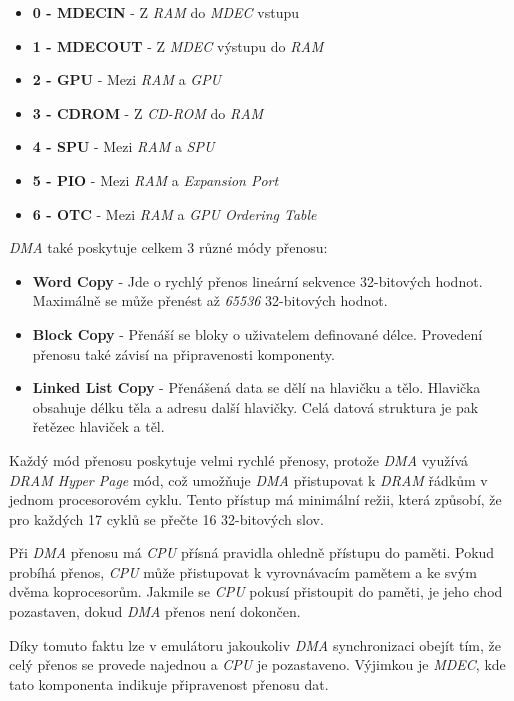 \begin{itemize}
    \item{\textbf{0 - MDECIN} - Z \textit{RAM} do \textit{MDEC} vstupu}
    \item{\textbf{1 - MDECOUT} - Z \textit{MDEC} výstupu do \textit{RAM}}
    \item{\textbf{2 - GPU} - Mezi \textit{RAM} a \textit{GPU}}
    \item{\textbf{3 - CDROM} - Z \textit{CD-ROM} do \textit{RAM}}
    \item{\textbf{4 - SPU} - Mezi \textit{RAM} a \textit{SPU}}
    \item{\textbf{5 - PIO} - Mezi \textit{RAM} a \textit{Expansion Port}}
    \item{\textbf{6 - OTC} - Mezi \textit{RAM} a \textit{GPU Ordering Table}}
\end{itemize}

\textit{DMA} také poskytuje celkem 3 různé módy přenosu:

\begin{itemize}
    \item{\textbf{Word Copy} - Jde o rychlý přenos lineární sekvence 32-bitových hodnot. Maximálně se může přenést až \textit{65536} 32-bitových hodnot.}
    \item{\textbf{Block Copy} - Přenáší se bloky o uživatelem definované délce. Provedení přenosu také závisí na připravenosti komponenty.}
    \item{\textbf{Linked List Copy} - Přenášená data se dělí na hlavičku a tělo. Hlavička obsahuje délku těla a adresu další hlavičky. Celá datová struktura je pak řetězec hlaviček a těl.}
\end{itemize}

Každý mód přenosu poskytuje velmi rychlé přenosy, protože \textit{DMA} využívá \textit{DRAM Hyper Page} mód, 
což umožňuje \textit{DMA} přistupovat k \textit{DRAM} řádkům v jednom procesorovém cyklu. 
Tento přístup má minimální režii, která způsobí, že pro každých 17 cyklů se přečte 16 32-bitových slov.

Při \textit{DMA} přenosu má \textit{CPU} přísná pravidla ohledně přístupu do paměti. 
Pokud probíhá přenos, \textit{CPU} může přistupovat k vyrovnávacím pamětem a ke svým dvěma koprocesorům. 
Jakmile se \textit{CPU} pokusí přistoupit do paměti, je jeho chod pozastaven, dokud \textit{DMA} přenos není dokončen.

Díky tomuto faktu lze v emulátoru jakoukoliv \textit{DMA} synchronizaci obejít tím, že celý přenos se provede najednou a \textit{CPU} je pozastaveno. 
Výjimkou je \textit{MDEC}, kde tato komponenta indikuje připravenost přenosu dat.

